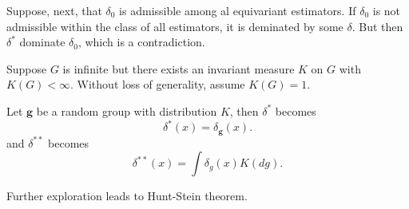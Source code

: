 \documentclass{article}
\theoremstyle{plain}
\theoremstyle{definition}
\begin{document}
Suppose, next, that $\delta_0$ is admissible among al equivariant estimators. If $\delta_0$ is not admissible within the class of all estimators, it is deminated by some $\delta$. But then $\delta^{*}$ dominate $\delta_0$, which is a contradiction.

Suppose $G$ is infinite but there exists an invariant measure $K$ on $G$ with $K(G)<\infty$.
Without loss of generality, assume $K(G)=1$.

Let $\mathbf{g}$ be a random group with distribution $K$,
then $\delta^*$ becomes
\begin{equation*}
    \delta^{*}(x)=\delta_{\mathbf{g}}(x).
\end{equation*}
and $\delta^{**}$ becomes
\begin{equation*}
    \delta^{**}(x)=\int \delta_{{g}}(x)K(dg).
\end{equation*}


Further exploration leads to Hunt-Stein theorem.
\end{document}
